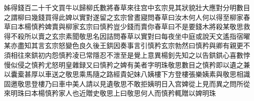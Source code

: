 姊得錢百二十千文買牛以歸柳氏數將春草來往宫中玄宗見其狀貌壯大應對分明數目之謂柳曰幾錢買得此婢以實對遂留之玄宗曾晝寢問春草曰汝木何人何以得至柳家春草曰本楊慎矜婢賣與柳家玄宗曰慎矜豈少錢而賣你春草曰不是要錢木將殺某敬思救得不殺所以賣之玄宗素聞敬思名因詰問春草以實對曰每夜坐中庭或說天文遙指宿曜某亦盡知其言玄宗怒變色良久後王鉷因奏事言引慎矜玄宗勃然曰慎矜與卿有親更不須相往來鉷初内怨慎矜凌已常隱忍不泄至是覺上意異楊釗先知之以告鉷鉷心喜數悖慢似侵之慎矜尤怒明皇雜録又曰慎矜之婢有美者字明珠敬思數目之慎矜即以遺之兼以囊槖甚厚以車送之敬思乘馬隨之路經貴妃妹八姨樓下方登樓張樂姨素與敬思相識固邀敬思登樓乃曰車中美人請以見遺敬思不敢拒姨明日入宫婢從上見而異之問所從來明珠曰本楊慎矜家人也近贈史敬思上曰敬思何人而慎矜輒贈以婢明珠